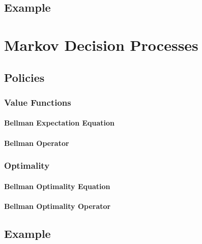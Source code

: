 		\subsection{Example} %

	\section{Markov Decision Processes} %

		\subsection{Policies} %

			\subsubsection{Value Functions} %

				\paragraph{Bellman Expectation Equation} %

				\paragraph{Bellman Operator} %

			\subsubsection{Optimality} %

				\paragraph{Bellman Optimality Equation} %

				\paragraph{Bellman Optimality Operator} %

		\subsection{Example} %

